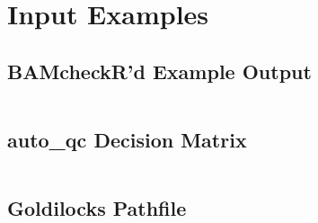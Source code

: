 \chapter{Input Examples}

\section{BAMcheckR'd Example Output}
\label{app:bamcheckr}
\inputminted[fontsize=\scriptsize]{text}{Appendix1/example.bamcheck.SN.txt}

\section{auto\_qc Decision Matrix}
\label{app:aqc_matrix}
\inputminted[fontsize=\scriptsize]{text}{Appendix1/example.aqc.txt}

\section{Goldilocks Pathfile}
\label{app:pathfile}
\inputminted[fontsize=\scriptsize]{text}{Appendix1/paths.g}
